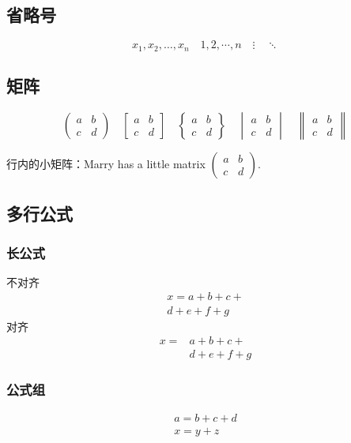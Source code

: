 \subsection{省略号}
\[ x_1,x_2,\dots ,x_n\quad 1,2,\cdots ,n\quad
\vdots\quad \ddots \]

\subsection{矩阵}
\[ \begin{pmatrix} a&b\\c&d \end{pmatrix} \quad
\begin{bmatrix} a&b\\c&d \end{bmatrix} \quad
\begin{Bmatrix} a&b\\c&d \end{Bmatrix} \quad
\begin{vmatrix} a&b\\c&d \end{vmatrix} \quad
\begin{Vmatrix} a&b\\c&d \end{Vmatrix} \]

行内的小矩阵：Marry has a little matrix $ ( \begin{smallmatrix} a&b\\c&d \end{smallmatrix} ) $.

\subsection{多行公式}

\subsubsection{长公式}
不对齐
\begin{multline}
x = a+b+c+{} \\
d+e+f+g
\end{multline}
对齐
\[\begin{aligned}
x ={}& a+b+c+{} \\
&d+e+f+g
\end{aligned}\]

\subsubsection{公式组}
\begin{gather}
a = b+c+d \\
x = y+z
\end{gather}

